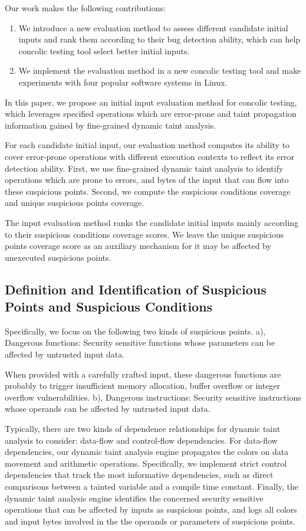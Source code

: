 Our work makes the following contributions:
\begin{enumerate}
    \item We introduce a new evaluation method to assess different candidate initial inputs and rank them according to their bug detection ability, which can help concolic testing tool select better initial inputs.
    \item We implement the evaluation method in a new concolic testing tool and make experiments with four popular software systems in Linux.
\end{enumerate}

In this paper, we propose an initial input evaluation method for concolic testing, which leverages specified operations which are error-prone and taint propagation information gained by fine-grained dynamic taint analysis.

For each candidate initial input, our evaluation method computes its ability to cover error-prone operations with different execution contexts to reflect its error detection ability. 
First, we use fine-grained dynamic taint analysis to identify operations which are prone to errors, and bytes of the input that can flow into these suspicious points.
Second, we compute the suspicious conditions coverage and unique suspicious points coverage.

The input evaluation method ranks the candidate initial inputs mainly according to their suspicious conditions coverage scores. 
We leave the unique suspicious points coverage score as an auxiliary mechanism for it may be affected by unexecuted suspicious points.

\subsection{Definition and Identification of Suspicious Points and Suspicious Conditions}
Specifically, we focus on the following two kinds of suspicious points. a), Dangerous functions: Security sensitive functions whose parameters can be affected by untrusted input data.

When provided with a carefully crafted input, these dangerous functions are probably to trigger insufficient memory allocation, buffer overflow or integer overflow vulnerabilities. b), Dangerous instructions: Security sensitive instructions whose operands can be affected by untrusted input data.

Typically, there are two kinds of dependence relationships for dynamic taint analysis to consider: data-flow and control-flow dependencies. 
For data-flow dependencies, our dynamic taint analysis engine propagates the colors on data movement and arithmetic operations.
Specifically, we implement strict control dependencies that track the most informative dependencies, such as direct comparisons between a tainted variable and a compile time constant.
Finally, the dynamic taint analysis engine identifies the concerned security sensitive operations that can be affected by inputs as suspicious points, and logs all colors and input bytes involved in the the operands or parameters of suspicious points.

